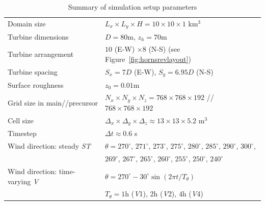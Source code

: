 		\begin{table}
			\centering
			\begin{tabularx}{\textwidth}{Xl}
				\hline
				\rule{0pt}{2.8ex}Domain size                             & $L_x \times L_y \times H = 10 \times 10 \times 1$ km$^3$ \\
				Turbine dimensions                      & $D = 80$m, $z_h = 70$m \\
				Turbine arrangement                     & $10$ (E-W) $\times 8$ (N-S) (see Figure~\ref{fig:hornsrevlayout})\\
				Turbine spacing                         & $S_x = 7D$ (E-W), $S_y = 6.95D$ (N-S) \\
				Surface roughness                         & $z_0 = 0.01$m  \\
				Grid size in main//precursor             & $N_x \times N_y \times N_z = 768 \times 768 \times 192$ // $768 \times 768 \times 192$ \\
				Cell size                                   & $\Delta_x \times \Delta_y \times \Delta_z \approx 13 \times 13 \times 5.2$ m$^3$ \\
				Timestep                                & $\Delta t \approx 0.6$ s\\
				Wind direction: steady \emph{ST}            & $\theta = 270^\circ$, $271^\circ$, $273^\circ$, $275^\circ$, $280^\circ$, $285^\circ$, $290^\circ$, $300^\circ$,  \\
				& \qquad \quad $269^\circ$, $267^\circ$, $265^\circ$, $260^\circ$, $255^\circ$, $250^\circ$, $240^\circ$\\
				Wind direction: time-varying \emph{V}      & $\theta = 270^\circ - 30^\circ\sin(2\pi t/T_\theta) $\\
				& \qquad \quad $T_\theta = 1$h (\emph{V}1), $2$h (\emph{V}2), $4$h (\emph{V}4) \\
				\hline
			\end{tabularx}
			\caption[Setup parameters for Horns Rev simulation cases.]{Summary of simulation setup parameters}
			\label{tab:simulationparameters}
		\end{table}
		
		
		
		
